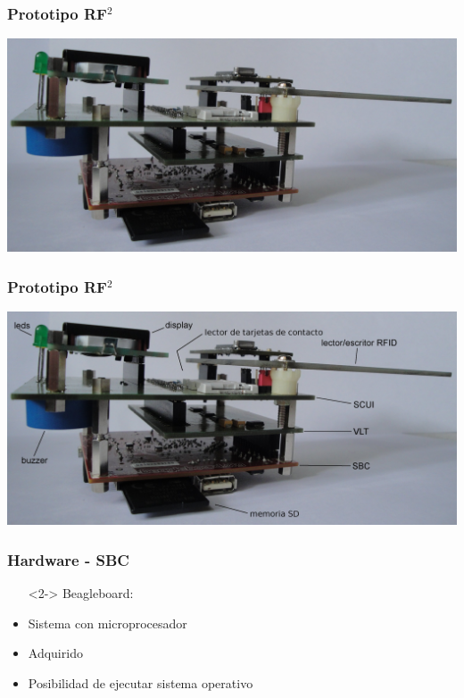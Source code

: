 \documentclass{beamer}
\begin{document}
\begin{frame}
	\frametitle{Prototipo RF$ ^{2} $}
	\begin{center}
		\includegraphics[scale=.12]{Imagenes/prototipo_s.jpg}
	\end{center}
\end{frame}


\begin{frame}
	\frametitle{Prototipo RF$ ^{2} $}
	\begin{center}
		\includegraphics[scale=.12]{Imagenes/prototipo_s_nombres.jpg}
	\end{center}
\end{frame}

\begin{frame}
	\frametitle{Hardware - SBC}
	\begin{itemize}
		\item[] <2-> Beagleboard:
	\end{itemize}
	\begin{figure}
		\centering		
	\end{figure}

	\begin{itemize}
		\item <3-> Sistema con microprocesador

		\bigskip
		\item <4-> Adquirido

		\bigskip
		\item <5-> Posibilidad de ejecutar sistema operativo
	\end{itemize}
\end{frame}
\end{document}
